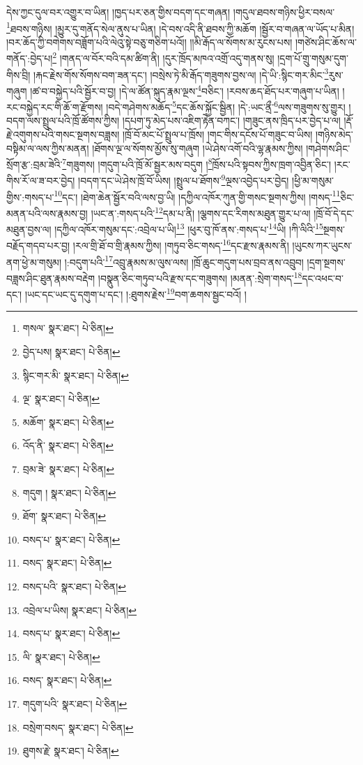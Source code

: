 དེས་ཀྱང་དུལ་བར་འགྱུར་བ་ཡིན། །ཁྱད་པར་ཅན་གྱིས་བདག་དང་གཞན། །གདུལ་ཐབས་གཉིས་ཕྱིར་བསལ་\footnote{གསལ་  སྣར་ཐང་།  པེ་ཅིན། }ཐབས་གཉིས། །མྱུར་དུ་གནོད་སེལ་ནུས་པ་ཡིན། །དེ་བས་འདི་ནི་ཐབས་ཀྱི་མཆོག །སྦྱོར་བ་གཞན་ལ་ཡོད་པ་མིན། །བར་ཆོད་ཀྱི་བགེགས་བཟློག་པའི་ལེའུ་སྟེ་བཅུ་གཅིག་པའོ།། །།མི་རྒོད་ལ་སོགས་མ་རུངས་པས། །གཙེས་ཤིང་ཆོས་ལ་གནོད་:བྱེད་པ།\footnote{བྱེད་པས།  སྣར་ཐང་།  པེ་ཅིན། } །གནད་ལ་བོར་བའི་དམ་ཚིག་ནི། །དུར་ཁྲོད་མཁའ་འགྲོ་འདུ་གནས་སུ། །དྲག་པོ་གྲུ་གསུམ་དུག་གིས་བྲི། །རྐང་རྗེས་གོས་སོགས་བག་ཟན་དང་། །བསྲེས་ཏེ་མི་རྒོད་གཟུགས་བྱས་ལ། །དེ་ཡི་:སྙིང་གར་མིང་\footnote{སྙིང་གར་མི་  སྣར་ཐང་།  པེ་ཅིན། }རུས་གཞུག །ཚ་བ་བསྐྱེད་པའི་སྦྱོར་བ་བྱ། །དེ་ལ་ཚོན་སྐུད་རྣམ་ལྔས་\footnote{ལྔ་  སྣར་ཐང་།  པེ་ཅིན། }བཅིང་། །རབས་ཆད་ཐོད་པར་གཞུག་པ་ཡིན། །རང་བསྐྱེད་རང་གི་ཆོ་ག་རྫོགས། །བདེ་གཤེགས་མཆོད་\footnote{མཆོག་  སྣར་ཐང་།  པེ་ཅིན། }དང་ཆོས་སྐྱོང་སྦྱིན། །དེ་:ཡང་ནྲྀ་\footnote{འོད་ནི་  སྣར་ཐང་།  པེ་ཅིན། }ལས་གཟུགས་སུ་གྱུར། །བདག་ལས་སྤྲུལ་པའི་ཁྲོ་ཚོགས་ཀྱིས། །དཔག་ཏུ་མེད་པས་འཇིག་རྟེན་བཀང་། །གཟུང་ནས་ཁྲིད་པར་བྱེད་པ་ལ། །རྡོ་རྗེ་འགུགས་པའི་གསང་སྔགས་བཟླས། །ཁྲོ་བོ་མང་པོ་སྤྲུལ་པ་ཁྲོས། །གང་གིས་དངོས་པོ་གཟུང་བ་ཡིས། །གཉིས་མེད་བསྟིམ་ལ་ལས་ཀྱིས་མནན། །ཐོགས་ལྔ་ལ་སོགས་མྱོས་སུ་གཞུག །ཡེ་ཤེས་འགོ་བའི་ལྷ་རྣམས་ཀྱིས། །གཤེགས་ཤིང་སྲོག་རྩ་:བྲམ་ཟེའི་\footnote{བྲམ་ཟེ་  སྣར་ཐང་།  པེ་ཅིན། }གཟུགས། །གདུག་པའི་ཁྲོ་མོ་སྦྱར་མས་བདུག །\footnote{གདུག །  སྣར་ཐང་།  པེ་ཅིན། }ཁྲོས་པའི་སྟབས་ཀྱིས་ཁྲག་འབྱིན་ཅིང་། །རང་གིས་རོ་ལ་ཟ་བར་བྱེད། །བདག་དང་ཡེ་ཤེས་ཁྲོ་བོ་ཡིས། །སྤྲུལ་པ་ཐོགས་\footnote{ཐོག་  སྣར་ཐང་།  པེ་ཅིན། }ལྔས་འབྱེད་པར་བྱེད། །ཕྱི་མ་གསུམ་གྱིས་:གསད་པ་\footnote{བསད་པ་  སྣར་ཐང་།  པེ་ཅིན། }དང་། །ཐེག་ཆེན་སྦྱོར་བའི་ལས་བྱ་ཡི། །དཀྱིལ་འཁོར་ཀུན་གྱི་གསང་སྔགས་ཀྱིས། །གསད་\footnote{བསད་  སྣར་ཐང་།  པེ་ཅིན། }ཅིང་མནན་པའི་ལས་རྣམས་བྱ། །ཡང་ན་:གསད་པའི་\footnote{བསད་པའི་  སྣར་ཐང་།  པེ་ཅིན། }དམ་པ་ནི། །ལྕགས་དང་རིགས་མཐུན་གྱུར་པ་ལ། །ཁྲོ་བོ་དེ་དང་མཐུན་བྱས་ལ། །དཀྱིལ་འཁོར་གསུམ་དང་:འབྲེལ་པ་ཡི།\footnote{འབྲེལ་པ་ཡིས།  སྣར་ཐང་།  པེ་ཅིན། } །ཕུར་བུ་ཁོ་ནས་:གསད་པ་\footnote{བསད་པ་  སྣར་ཐང་།  པེ་ཅིན། }ཡི། །ཀི་ལིའི་\footnote{ལི་  སྣར་ཐང་།  པེ་ཅིན། }སྔགས་བརྗོད་གདབ་པར་བྱ། །རལ་གྲི་ཐོ་བ་གྲི་རྣམས་ཀྱིས། །གཏུབ་ཅིང་གསད་\footnote{བསད་  སྣར་ཐང་།  པེ་ཅིན། }དང་རྫས་རྣམས་ནི། །ཡུངས་ཀར་ཡུངས་ནག་ཕྱེ་མ་གསུམ། །:བདུག་པའི་\footnote{གདུག་པའི་  སྣར་ཐང་།  པེ་ཅིན། }འབྲུ་རྣམས་མ་ལུས་ལས། །ཁྲོ་ཆུང་གདུག་པས་བྲབ་ནས་འབྲུབ། །དྲག་སྔགས་བཟླས་ཤིང་ཐུན་རྣམས་བརྡེག །བསྣུན་ཅིང་གཏུབ་པའི་རྫས་དང་གཟུགས། །མནན་:སྲེག་གསད་\footnote{བསྲེག་བསད་  སྣར་ཐང་།  པེ་ཅིན། }དང་འཕང་བ་དང་། །ཡང་དང་ཡང་དུ་དགུག་པ་དང་། །:ཐུགས་རྗེས་\footnote{ཐུགས་རྗེ་  སྣར་ཐང་།  པེ་ཅིན། }བག་ཆགས་སྦྱང་བའོ། །
